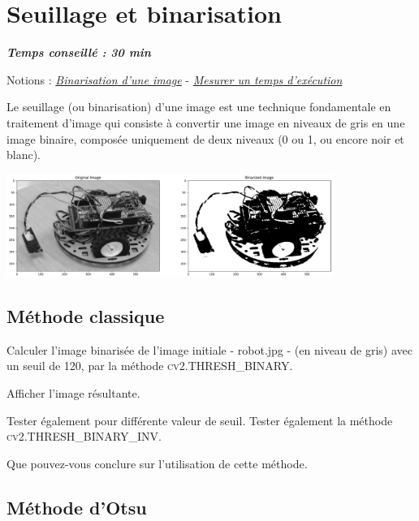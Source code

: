\documentclass[a4paper,11pt,titlepage]{article} %
\begin{document}
\newpage
\section{Seuillage et binarisation}

\begin{center} \textbf{\textit{Temps conseillé : 30 min}} \end{center}

\begin{mdframed}[style=sidebar,frametitle={}]
Notions : \href{https://iogs-lense-training.github.io/image-processing/contents/opencv.html#binarize-an-image}{\textit{Binarisation d'une image}} - \href{https://iogs-lense-training.github.io/python-for-science/contents/python_time.html}{\textit{Mesurer un temps d'exécution}}
\end{mdframed}

Le seuillage (ou binarisation) d'une image est une technique fondamentale en traitement d'image qui consiste à convertir une image en niveaux de gris en une image binaire, composée uniquement de deux niveaux (0 ou 1, ou encore noir et blanc).

\begin{center}
	\includegraphics[width=0.8\textwidth]{images/binarized_image.png}
\end{center}

\subsection{Méthode classique}

\Manip Calculer l'image binarisée de l'image initiale - robot.jpg - (en niveau de gris) avec un seuil de 120, par la méthode \textsc{cv2.THRESH\_BINARY}.

\Manip Afficher l'image résultante. 

\Manip Tester également pour différente valeur de seuil. Tester également la méthode \textsc{cv2.THRESH\_BINARY\_INV}.

\Quest Que pouvez-vous conclure sur l'utilisation de cette méthode.

\subsection{Méthode d'Otsu}
\end{document}
